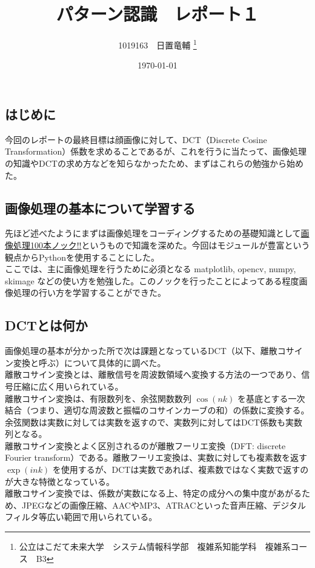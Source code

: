 \documentclass[dvipdfmx,uplatex]{jsarticle}
\title{パターン認識　レポート１}
\author{1019163　日置竜輔 \thanks{公立はこだて未来大学　システム情報科学部　複雑系知能学科　複雑系コース　B3}}
\date{\today}
\begin{document}
\begin{spacing}{1.4}

\maketitle
\tableofcontents %

\newpage

\section{はじめに}
今回のレポートの最終目標は顔画像に対して、DCT（Discrete Cosine Transformation）係数を求めることであるが、これを行うに当たって、画像処理の知識やDCTの求め方などを知らなかったため、まずはこれらの勉強から始めた。 \\

\subsection{画像処理の基本について学習する}
先ほど述べたようにまずは画像処理をコーディングするための基礎知識として\href{https://github.com/yoyoyo-yo/Gasyori100knock}{画像処理100本ノック!!}というもので知識を深めた。今回はモジュールが豊富という観点からPythonを使用することにした。 \\
ここでは、主に画像処理を行うために必須となる matplotlib, opencv, numpy, skimage などの使い方を勉強した。このノックを行ったことによってある程度画像処理の行い方を学習することができた。

\subsection{DCTとは何か}
画像処理の基本が分かった所で次は課題となっているDCT（以下、離散コサイン変換と呼ぶ）について具体的に調べた。 \\
離散コサイン変換とは、離散信号を周波数領域へ変換する方法の一つであり、信号圧縮に広く用いられている。 \\
離散コサイン変換は、有限数列を、余弦関数数列 $\cos(nk)$ を基底とする一次結合（つまり、適切な周波数と振幅のコサインカーブの和）の係数に変換する。余弦関数は実数に対しては実数を返すので、実数列に対してはDCT係数も実数列となる。\\
離散コサイン変換とよく区別されるのが離散フーリエ変換（DFT: discrete Fourier transform）である。離散フーリエ変換は、実数に対しても複素数を返す$\exp(ink)$ を使用するが、DCTは実数であれば、複素数ではなく実数で返すのが大きな特徴となっている。 \\
離散コサイン変換では、係数が実数になる上、特定の成分への集中度があがるため、JPEGなどの画像圧縮、AACやMP3、ATRACといった音声圧縮、デジタルフィルタ等広い範囲で用いられている。


\end{spacing}
\end{document}
